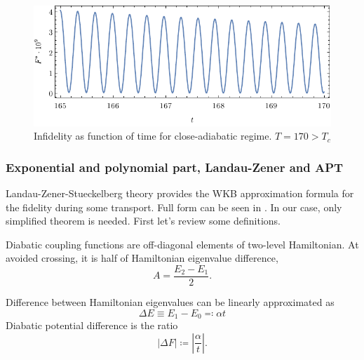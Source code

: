 \begin{figure}[H]
    \centering
    \includegraphics[scale=1.2]{../img/overcritical.pdf}
    \caption{Infidelity as function of time for close-adiabatic regime. $T=170>T_c$}
    \label{fig:overcritical}
\end{figure}

\subsubsection{Exponential and polynomial part, Landau-Zener and APT}
Landau-Zener-Stueckelberg theory provides the WKB approximation formula for the fidelity during some transport. Full form can be seen in \cite{nonadiabaticTransition}. In our case, only simplified theorem is needed. First let's review some definitions.

\begin{definition}
    Diabatic coupling functions are off-diagonal elements of two-level Hamiltonian. At avoided crossing, it is half of Hamiltonian eigenvalue difference,
    \begin{equation}
        A=\frac{E_2-E_1}{2}.
    \end{equation}
\end{definition}
\begin{definition}
    Difference between Hamiltonian eigenvalues can be linearly approximated as
    \begin{equation}
        \Delta E\equiv E_1-E_0 \eqqcolon \alpha t
    \end{equation}
    Diabatic potential difference is the ratio
    \begin{equation}
        |\Delta F|\coloneqq \left|\frac{\alpha}{t}\right|.
    \end{equation}
\end{definition}

